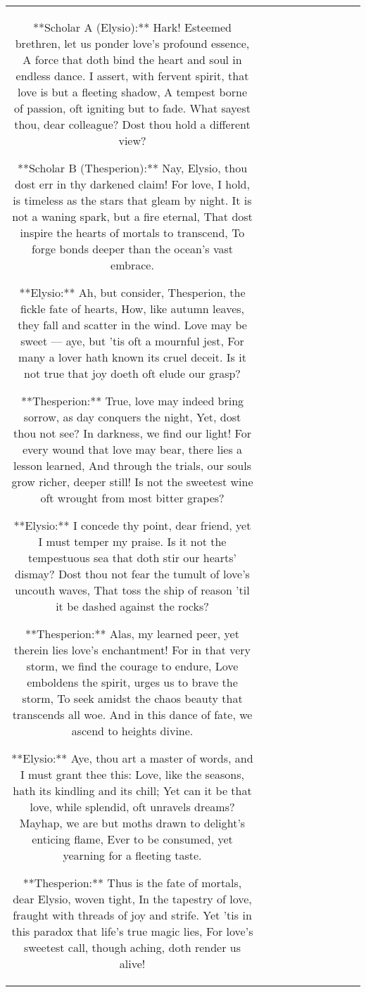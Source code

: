 \begin{table}[h!]
\begin{tabular}{|c|c|c|c|c|c|c|c|c|c|}
**Scholar A (Elysio):**  
Hark! Esteemed brethren, let us ponder love's profound essence,  
A force that doth bind the heart and soul in endless dance.  
I assert, with fervent spirit, that love is but a fleeting shadow,  
A tempest borne of passion, oft igniting but to fade.  
What sayest thou, dear colleague? Dost thou hold a different view?  

**Scholar B (Thesperion):**  
Nay, Elysio, thou dost err in thy darkened claim!  
For love, I hold, is timeless as the stars that gleam by night.  
It is not a waning spark, but a fire eternal,  
That dost inspire the hearts of mortals to transcend,  
To forge bonds deeper than the ocean's vast embrace.  

**Elysio:**  
Ah, but consider, Thesperion, the fickle fate of hearts,  
How, like autumn leaves, they fall and scatter in the wind.  
Love may be sweet — aye, but 'tis oft a mournful jest,  
For many a lover hath known its cruel deceit.  
Is it not true that joy doeth oft elude our grasp?  

**Thesperion:**  
True, love may indeed bring sorrow, as day conquers the night,  
Yet, dost thou not see? In darkness, we find our light!  
For every wound that love may bear, there lies a lesson learned,  
And through the trials, our souls grow richer, deeper still!  
Is not the sweetest wine oft wrought from most bitter grapes?  

**Elysio:**  
I concede thy point, dear friend, yet I must temper my praise.  
Is it not the tempestuous sea that doth stir our hearts’ dismay?  
Dost thou not fear the tumult of love’s uncouth waves,  
That toss the ship of reason 'til it be dashed against the rocks?  

**Thesperion:**  
Alas, my learned peer, yet therein lies love's enchantment!  
For in that very storm, we find the courage to endure,  
Love emboldens the spirit, urges us to brave the storm,  
To seek amidst the chaos beauty that transcends all woe.  
And in this dance of fate, we ascend to heights divine.  

**Elysio:**  
Aye, thou art a master of words, and I must grant thee this:  
Love, like the seasons, hath its kindling and its chill;  
Yet can it be that love, while splendid, oft unravels dreams?  
Mayhap, we are but moths drawn to delight’s enticing flame,  
Ever to be consumed, yet yearning for a fleeting taste.  

**Thesperion:**  
Thus is the fate of mortals, dear Elysio, woven tight,  
In the tapestry of love, fraught with threads of joy and strife.  
Yet ’tis in this paradox that life’s true magic lies,  
For love’s sweetest call, though aching, doth render us alive!  


\end{tabular}
\end{table}
